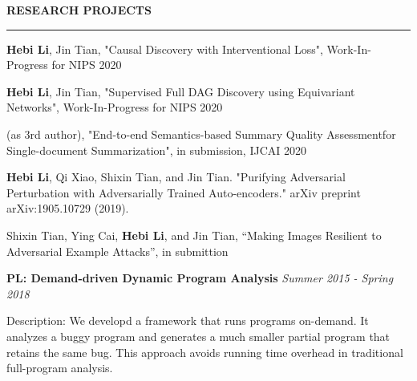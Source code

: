 \documentclass[10pt,letterpaper]{article}
\newenvironment{mysection}[1]{ %
  \medskip
  \MakeUppercase{\bf #1}
  \medskip
  \hrule
  \medskip
  \begin{list}{}{
      \setlength{\leftmargin}{1.5em}
    }
  \item[]
}{
  \end{list}
}
\begin{document}
\begin{mysection}{Research Projects}
  \textbf{Hebi Li}, Jin Tian, "Causal Discovery with Interventional Loss",
  Work-In-Progress for NIPS 2020

  \textbf{Hebi Li}, Jin Tian, "Supervised Full DAG Discovery using Equivariant
  Networks", Work-In-Progress for NIPS 2020

  (as 3rd author), "End-to-end Semantics-based Summary Quality Assessmentfor
  Single-document Summarization", in submission, IJCAI 2020

  \textbf{Hebi Li}, Qi Xiao, Shixin Tian, and Jin Tian. "Purifying
  Adversarial Perturbation with Adversarially Trained Auto-encoders."
  arXiv preprint arXiv:1905.10729 (2019).

  Shixin Tian, Ying Cai, \textbf{Hebi Li}, and Jin Tian, ``Making
  Images Resilient to Adversarial Example Attacks'', in submittion


  \textbf{PL: Demand-driven Dynamic Program Analysis} \hfill \emph{Summer 2015 - Spring 2018}

  
  Description: We developd a framework that runs programs on-demand.
  It analyzes a buggy program and generates a much smaller partial
  program that retains the same bug. This approach avoids running time
  overhead in traditional full-program analysis.



\end{mysection}
\end{document}
